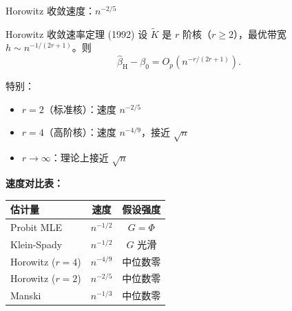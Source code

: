 \documentclass[aspectratio=169, 10pt]{beamer}
\begin{document}
\begin{frame}{Horowitz 收敛速度：$n^{-2/5}$}

  \begin{definitionbox}{{Horowitz 收敛速率定理 (1992)}}
    设 $\tilde K$ 是 $r$ 阶核（$r \geq 2$），最优带宽 $h \sim n^{-1/(2r+1)}$。则
    $$\hat\beta_{\text{H}} - \beta_0 = O_p(n^{-r/(2r+1)}).$$

    特别：
    \begin{itemize}\setlength{\itemsep}{1pt}
      \item $r = 2$（标准核）：速度 $n^{-2/5}$
      \item $r = 4$（高阶核）：速度 $n^{-4/9}$，接近 $\sqrt{n}$
      \item $r \to \infty$：理论上接近 $\sqrt{n}$
    \end{itemize}
  \end{definitionbox}

  \begin{highlightbox}
    \textbf{速度对比表：}
    \begin{center}\footnotesize
    \begin{tabular}{p{3cm}|c|c}
    \hline
    估计量 & 速度 & 假设强度 \\
    \hline
    Probit MLE & $n^{-1/2}$ & $G = \Phi$ \\
    Klein-Spady & $n^{-1/2}$ & $G$ 光滑 \\
    Horowitz ($r=4$) & $n^{-4/9}$ & 中位数零 \\
    Horowitz ($r=2$) & $n^{-2/5}$ & 中位数零 \\
    Manski & $n^{-1/3}$ & 中位数零 \\
    \hline
    \end{tabular}
    \end{center}
  \end{highlightbox}

  \hypertarget{main-c15}{}
  \hfill{\scriptsize\hyperlink{proof-c15}{}}

\end{frame}
\end{document}
